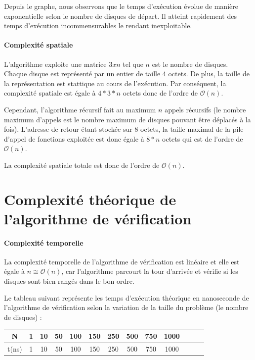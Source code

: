 Depuis le graphe, nous observons que le temps d'exécution évolue de manière exponentielle selon le nombre de disques de départ. Il atteint rapidement des temps d'exécution incommensurables le rendant inexploitable.

\paragraph{Complexité spatiale}
L'algorithme exploite une matrice $3 x n$ tel que $n$ est le nombre de disques. Chaque disque est représenté par un entier de taille $4$ octets. De plus, la taille de la représentation est stattique au cours de l'exécution. Par conséquent, la complexité spatiale est égale à $4 * 3 * n$ octets donc de l'ordre de $\mathcal{O}(n)$.
\par
Cependant, l'algorithme récursif fait au maximum $n$ appels récursifs (le nombre maximum d'appels est le nombre maximum de disques pouvant être déplacés à la fois). L'adresse de retour étant stockée sur $8$ octets, la taille maximal de la pile d'appel de fonctions exploitée est donc égale à $8 * n$ octets qui est de l'ordre de $\mathcal{O}(n)$.
\par
La complexité spatiale totale est donc de l'ordre de $\mathcal{O}(n)$.

\section{Complexité théorique de l'algorithme de vérification}
\paragraph{Complexité temporelle}
La complexité temporelle de l'algorithme de vérification est linéaire et elle est égale à $n \cong \mathcal{O}(n)$, car l'algorithme parcourt la tour d'arrivée et vérifie si les disques sont bien rangés dans le bon ordre.
\par
Le tableau suivant représente les temps d'exécution théorique en nanoseconde de l'algorithme de vérification selon la variation de la taille du problème (le nombre de disques) :

\small
\begin{center}
    \begin{tabular}{| c | c | c | c | c | c | c | c | c | c | c | c | c |}
        \hline
        N & 1 & 10 & 50 & 100 & 150 & 250 & 500 & 750 & 1000\\
        \hline
        t(ns) & 1 & 10 & 50 & 100 & 150 & 250 & 500 & 750 & 1000\\
        \hline
    \end{tabular}
\end{center}

